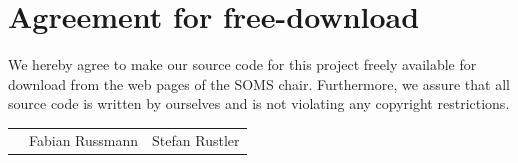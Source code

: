 \documentclass[11pt]{article}
\begin{document}

\newpage


\newpage
\section*{Agreement for free-download}
\bigskip


\bigskip


\large We hereby agree to make our source code for this project freely available for download from the web pages of the SOMS chair. Furthermore, we assure that all source code is written by ourselves and is not violating any copyright restrictions.

\begin{center}

\bigskip


\bigskip


\begin{tabular}{@{}p{3.3cm}@{}p{6cm}@{}@{}p{6cm}@{}}
\begin{minipage}{3cm}

\end{minipage}
&
\begin{minipage}{6cm}
\vspace{2mm} \large Fabian Russmann

 \vspace{\baselineskip}

\end{minipage}
&
\begin{minipage}{6cm}

\large Stefan Rustler

\end{minipage}
\end{tabular}


\end{center}
\newpage







\tableofcontents

\newpage

\end{document}
